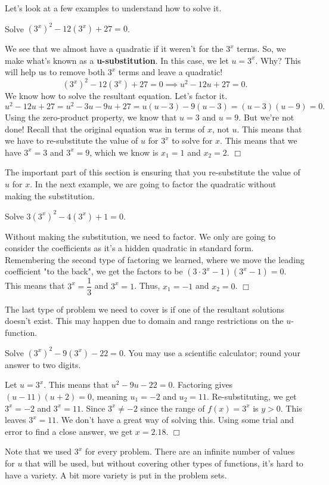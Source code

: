 \documentclass[lang=en,11pt]{elegantbook}
\begin{document}
Let's look at a few examples to understand how to solve it.  
\begin{example}
Solve $\left(3^x\right)^2-12\left(3^x\right)+27=0$.
\end{example}
\begin{solution}
We see that we almost have a quadratic if it weren't for the $3^x$ terms.  So, we make what's known as a \textbf{u-substitution}.  In this case, we let $u=3^x$.  Why?  This will help us to remove both $3^x$ terms and leave a quadratic!
$$\left(3^x\right)^2-12\left(3^x\right)+27=0 \implies u^2-12u+27=0.$$  We know how to solve the resultant equation.  Let's factor it.  $$u^2-12u+27=u^2-3u-9u+27=u(u-3)-9(u-3)=(u-3)(u-9)=0.$$
Using the zero-product property, we know that $u=3$ and $u=9$.  But we're not done!  Recall that the original equation was in terms of $x$, not $u$.  This means that we have to re-substitute the value of $u$ for $3^x$ to solve for $x$.  This means that we have $3^x=3$ and $3^x=9$, which we know is $x_1=1$ and $x_2=2$.  $\Box$
\end{solution}
The important part of this section is ensuring that you re-substitute the value of $u$ for $x$.  In the next example, we are going to factor the quadratic without making the substitution.
\begin{example}
Solve $3\left(3^x\right)^2-4\left(3^x\right)+1=0$.
\end{example}
\begin{solution}
Without making the substitution, we need to factor.  We only are going to consider the coefficients as it's a hidden quadratic in standard form.  Remembering the second type of factoring we learned, where we move the leading coefficient "to the back", we get the factors to be $\left(3\cdot 3^x-1\right)\left(3^x-1\right)=0.$  This means that $3^x=\dfrac{1}{3}$ and $3^x=1$.  Thus, $x_1=-1$ and $x_2=0$.  $\Box$
\end{solution}
The last type of problem we need to cover is if one of the resultant solutions doesn't exist.  This may happen due to domain and range restrictions on the $u$-function.
\begin{example}
Solve $\left(3^x\right)^2-9\left(3^x\right)-22=0$.  You may use a scientific calculator; round your answer to two digits.
\end{example}
\begin{solution}
Let $u=3^x$.  This means that $u^2-9u-22=0$.  Factoring gives $(u-11)(u+2)=0$, meaning $u_1=-2$ and $u_2=11$.  Re-substituting, we get $3^x=-2$ and $3^x=11$.  Since $3^x\neq -2$ since the range of $f(x)=3^x$ is $y>0$.  This leaves $3^x=11$.  We don't have a great way of solving this.  Using some trial and error to find a close answer, we get $x=2.18$.  $\Box$
\end{solution}
Note that we used $3^x$ for every problem.  There are an infinite number of values for $u$ that will be used, but without covering other types of functions, it's hard to have a variety.  A bit more variety is put in the problem sets.
\end{document}
